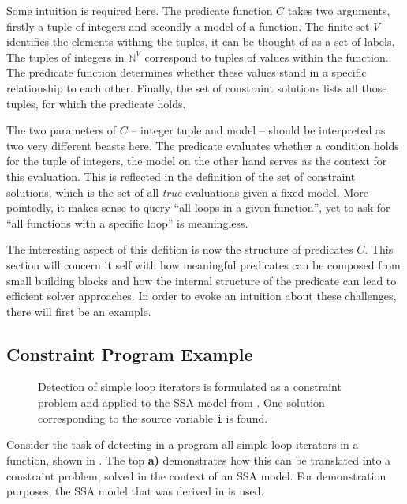     Some intuition is required here.
    The predicate function $C$ takes two arguments, firstly a tuple of integers
    and secondly a model of a function.
    The finite set $V$ identifies the elements withing the tuples, it can be
    thought of as a set of labels.
    The tuples of integers in $\mathbb N^V$ correspond to tuples of values
    within the function.
    The predicate function determines whether these values stand in a specific
    relationship to each other.
    Finally, the set of constraint solutions lists all those tuples, for which
    the predicate holds.

    The two parameters of $C$ -- integer tuple and model -- should be
    interpreted as two very different beasts here.
    The predicate evaluates whether a condition holds for the tuple of integers,
    the model on the other hand serves as the context for this evaluation.
    This is reflected in the definition of the set of constraint solutions,
    which is the set of all {\em true} evaluations given a fixed model.
    More pointedly, it makes sense to query ``all loops in a given function'',
    yet to ask for ``all functions with a specific loop'' is meaningless.

    The interesting aspect of this defition is now the structure of predicates
    $C$.
    This section will concern it self with how meaningful predicates can be
    composed from small building blocks and how the internal structure of the
    predicate can lead to efficient solver approaches.
    In order to evoke an intuition about these challenges, there will first be
    an example.

\subsection{Constraint Program Example}

\begin{figure}[p]
    
\caption{Detection of simple loop iterators is formulated as a constraint
         problem and applied to the SSA model from .
         One solution corresponding to the source variable {\tt i} is found.}
\label{fig:constraintsolution}
\end{figure}

    Consider the task of detecting in a program all simple loop iterators in a
    function, shown in .
    The top {\bf a)} demonstrates how this can be translated into a constraint
    problem, solved in the context of an SSA model.
    For demonstration purposes, the SSA model that was derived in
     is used.

